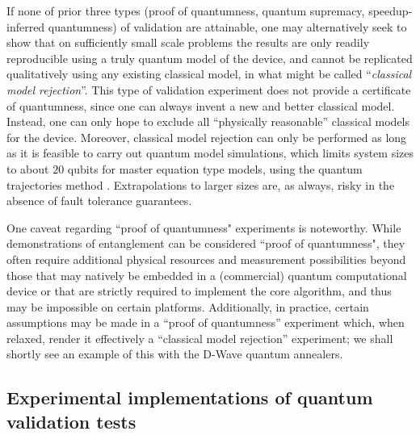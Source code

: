 If none of prior three types (proof of quantumness, quantum supremacy, speedup-inferred quantumness) of validation are attainable, one may alternatively seek to show that on sufficiently small scale problems the results are only readily reproducible using a truly quantum model of the device, and cannot be replicated qualitatively using any existing classical model, in what might be called ``\emph{classical model rejection}''. This type of validation experiment does not provide a certificate of quantumness, since one can always invent a new and better classical model. Instead, one can only hope to exclude all ``physically reasonable'' classical models for the device. Moreover, classical model rejection can only be performed as long as it is feasible to carry out quantum model simulations, which limits system sizes to about $20$ qubits for master equation type models, using the quantum trajectories method \cite{Yip:2017}. Extrapolations to larger sizes are, as always, risky in the absence of fault tolerance guarantees.

One caveat regarding ``proof of quantumness" experiments is noteworthy. While demonstrations of entanglement can be considered ``proof of quantumness", they often require additional physical resources and measurement possibilities beyond those that may natively be embedded in a (commercial) quantum computational device or that are strictly required to implement the core algorithm, and thus may be impossible on certain platforms. Additionally, in practice, certain assumptions may be made in a ``proof of quantumness'' experiment which, when relaxed, render it effectively a ``classical model rejection'' experiment; we shall shortly see an example of this with the D-Wave quantum annealers.


\subsection{Experimental implementations of quantum validation tests}
\label{sec:QVT-expt}

